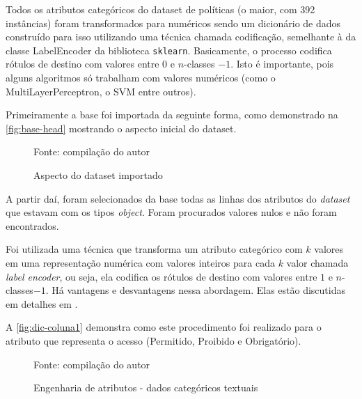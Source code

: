 Todos os atributos categóricos do dataset de políticas (o maior, com 392 instâncias) foram transformados para numéricos sendo um dicionário de dados construído para isso utilizando uma técnica chamada codificação, semelhante à da classe LabelEncoder da biblioteca \texttt{sklearn}. Basicamente, o processo codifica rótulos de destino com valores entre $0$ e $n$-classes $- 1$. Isto é importante, pois alguns algoritmos só trabalham com valores numéricos (como o MultiLayerPerceptron, o SVM entre outros).

Primeiramente a base foi importada da seguinte forma, como demonstrado na \autoref{fig:base-head} mostrando o aspecto inicial do dataset.

\begin{figure}[h!]
	\centering
	\caption{Aspecto do dataset importado}
	
	\label{fig:base-head}
	{\scriptsize Fonte: compilação do autor}
\end{figure}

A partir daí, foram selecionados da base todas as linhas dos atributos do \textit{dataset} que estavam com os tipos \textit{object}. Foram procurados valores nulos e não foram encontrados. 

Foi utilizada uma técnica que transforma um atributo categórico com $k$ valores em uma representação numérica com valores inteiros para cada $k$ valor chamada \textit{label encoder}, ou seja, ela codifica os rótulos de destino com valores entre $1$ e $n$-classes$-1$. Há vantagens e desvantagens nessa abordagem. Elas estão discutidas em detalhes em .

A \autoref{fig:dic-coluna1} demonstra como este procedimento foi realizado para o atributo que representa o acesso (Permitido, Proibido e Obrigatório).

\begin{figure}[h]
	\centering
	\caption{Engenharia de atributos - dados categóricos textuais}
	
	\label{fig:dic-coluna1}
	{\scriptsize Fonte: compilação do autor}
\end{figure}


